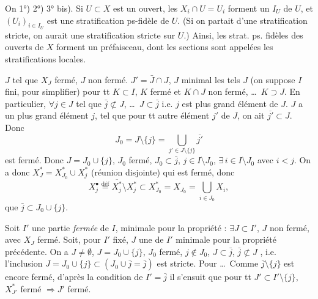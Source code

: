 \documentclass[11pt,a4paper]{article}
\begin{document}
On   1°) 2°) 3° bis). Si $U\subset X$ est un ouvert, les $X_i\cap U=U_i$  \struck{\ill{}} forment un  $I_U$ de $U$, et \struck{\ill{}} $(U_i)_{i\in I_U}$ est une stratification \struck{\ill{}} ps-fidèle de $U$. (Si on partait d'une stratification stricte, on aurait une stratification stricte sur $U$.) Ainsi, les strat. ps. fidèles des ouverts de $X$ forment un préfaisceau, dont les sections sont appelées les stratifications locales.



  $J$ tel que $X_J$ fermé, $J$ non fermé.   $J'=\bar J\cap J$,   $J$  minimal  les tels $J$ (on suppose $I$ fini, pour simplifier)  \ill{} pour tt $K\subset I$, $K$ fermé et $K\cap J$ non fermé, \ldots\ $K\supset J$. En particulier, $\forall j\in J$ tel que $\bar j\not\subset J$, \ldots\ $J\subset\bar j$ i.e. $j$ est plus grand élément de $J$.  $J$ a un plus grand élément $j$, tel que pour tt autre élément $j'$ de $J$, on ait $\overline{j'}\subset J$. Donc
\[
J_0=J\setminus\lbrace j\rbrace=\bigcup_{j'\in J\setminus\lbrace j\rbrace}\overline{j'}
\]
est fermé.
Donc $J=J_0\cup\lbrace j\rbrace$, $J_0$ fermé,  $J_0\subset\bar j$, $j\in I\setminus J_0$, $\exists\, i\in I\setminus J_0$ avec $i<j$.  On a donc
$X_J^{*}=X_{J_0}^{*}\cup X_j^{*}$ (réunion disjointe) qui est fermé, donc
\[
X_j^{\bullet}\overset{\text{déf}}{=}\overline{X_j^{*}}\setminus X_j^{*}\subset X_{J_0}^{*}=X_{J_0}=\bigcup_{i\in J_0}X_i ,
\]
 que  $\bar j\subset J_0\cup\lbrace j\rbrace$.

Soit $I'$ une partie \emph{fermée} de $I$, minimale pour la propriété : $\exists J\subset I'$, $J$ non fermé, avec $X_J$ fermé. Soit, pour $I'$ fixé, $J$ une \struck{\ill{}}  de $I'$ minimale pour la propriété précédente. On a $J\neq\emptyset$,  $J=J_0\cup\lbrace j\rbrace$, \struck{\ill{}} $J_0$ fermé, $j\notin J_0$, \struck{\ill{}} $J\subset\bar j$, $\bar j\not\subset J$ , i.e. l'inclusion $J=J_0\cup\lbrace j\rbrace\subset(J_0\cup\bar j=\bar j)$ \struck{\ill{}} est stricte.  Pour \ldots\ Comme $\bar j\setminus\lbrace j\rbrace$ est encore fermé, d'après la condition  de $I'=\bar j$ il s'ensuit que pour tt $J'\subset I'\setminus\lbrace j\rbrace$, $X_{J'}^{*}$ fermé $\Rightarrow J'$ fermé.
\end{document}
